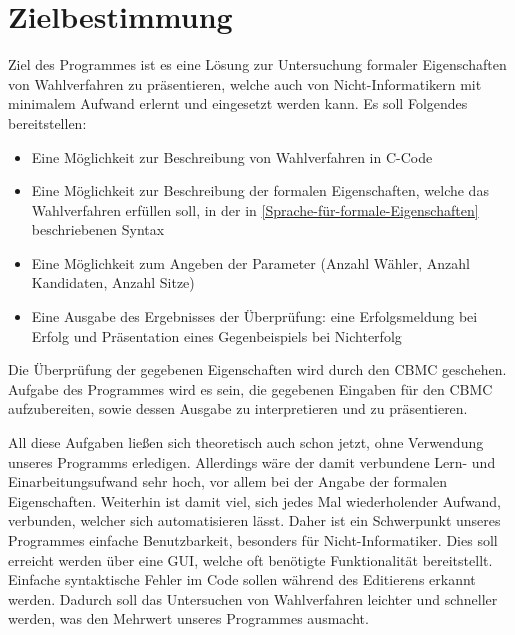 \documentclass[a4paper]{scrreprt}
\begin{document}
\chapter{Zielbestimmung}
Ziel des Programmes ist es eine  Lösung zur Untersuchung formaler Eigenschaften von Wahlverfahren zu präsentieren, welche auch von Nicht-Informatikern mit minimalem Aufwand erlernt und eingesetzt werden kann. 
Es soll Folgendes bereitstellen:
\begin{itemize}
\item Eine Möglichkeit zur Beschreibung von Wahlverfahren in C-Code  
\item Eine Möglichkeit zur Beschreibung der formalen Eigenschaften, welche das Wahlverfahren erfüllen soll, in der in \ref{Sprache-für-formale-Eigenschaften} beschriebenen Syntax 
\item Eine Möglichkeit zum Angeben der Parameter (Anzahl Wähler, Anzahl Kandidaten, Anzahl Sitze) 
\item Eine Ausgabe des Ergebnisses der Überprüfung: eine Erfolgsmeldung bei Erfolg und Präsentation eines Gegenbeispiels bei Nichterfolg
\end{itemize}

Die Überprüfung der gegebenen Eigenschaften wird durch den \ac{CBMC} geschehen. Aufgabe des Programmes wird es sein, die gegebenen Eingaben für den \ac{CBMC} aufzubereiten, sowie dessen Ausgabe zu interpretieren und zu präsentieren. 

All diese Aufgaben ließen sich theoretisch auch schon jetzt, ohne Verwendung unseres Programms erledigen. Allerdings wäre der damit verbundene Lern- und Einarbeitungsufwand sehr hoch, vor allem bei der Angabe der formalen Eigenschaften. Weiterhin ist damit viel, sich jedes Mal wiederholender Aufwand, verbunden, welcher sich automatisieren lässt. Daher ist ein Schwerpunkt unseres Programmes einfache Benutzbarkeit, besonders für Nicht-Informatiker. Dies soll erreicht werden über eine \ac{GUI}, welche oft benötigte Funktionalität bereitstellt. Einfache syntaktische Fehler im Code sollen während des Editierens erkannt werden. Dadurch soll das Untersuchen von Wahlverfahren leichter und schneller werden, was den Mehrwert unseres Programmes ausmacht.
\end{document}
